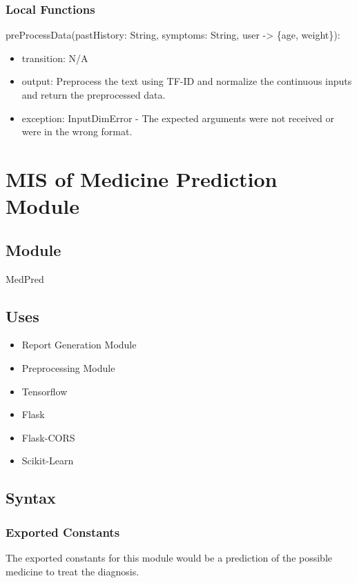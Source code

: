 \documentclass[12pt, titlepage]{article}
\begin{document}
\subsubsection{Local Functions}

\noindent preProcessData(pastHistory: String, symptoms: String, user -> \{age, weight\}):
\begin{itemize}
\item transition: N/A
\item output: Preprocess the text using TF-ID and normalize the continuous inputs and return the preprocessed data.
\item exception: InputDimError - The expected arguments were not received or were in the wrong format.
\end{itemize}

\newpage
  
\section{MIS of Medicine Prediction Module} \label{med_pred_mod}


\subsection{Module}

MedPred

\subsection{Uses}
\begin{itemize}
  \item Report Generation Module    
  \item Preprocessing Module
  \item Tensorflow
  \item Flask
  \item Flask-CORS
  \item Scikit-Learn

\end{itemize}

\subsection{Syntax}

\subsubsection{Exported Constants}
The exported constants for this module would be a prediction of the possible medicine to treat the diagnosis.
\end{document}
